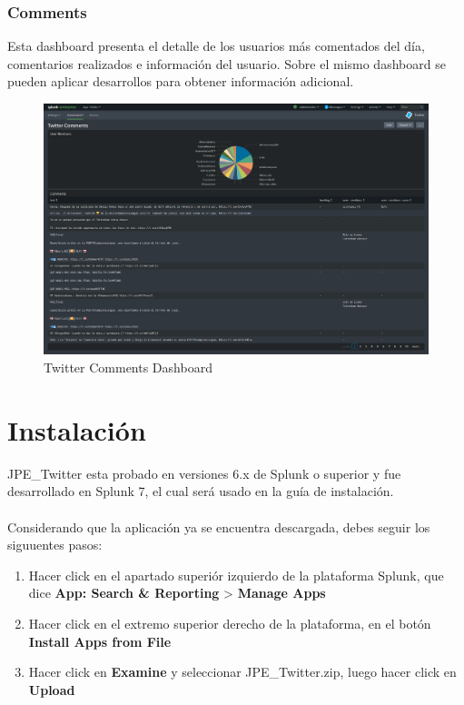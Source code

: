 \documentclass[a4paper]{article}
\begin{document}
\newpage

\subsubsection{Comments}

Esta dashboard presenta el detalle de los usuarios m\'as comentados del d\'ia, comentarios realizados e informaci\'on del usuario. Sobre el mismo dashboard se pueden aplicar desarrollos para obtener informaci\'on adicional.
\newline
\begin{figure}[h!]
	\centering
	\includegraphics[scale=0.2]{img/comments.png}
	\caption{\color{text}Twitter Comments Dashboard}
\end{figure}

\newpage

\section{Instalaci\'on}

JPE\_Twitter esta probado en versiones 6.x de Splunk o superior y fue desarrollado en Splunk 7, el cual ser\'a usado en la gu\'ia de instalaci\'on.\\
\\
Considerando que la aplicaci\'on ya se encuentra descargada, debes seguir los siguuentes pasos:
\newline
\begin{enumerate}[label=(\alph*)]
\item Hacer click en el apartado superi\'or izquierdo de la plataforma Splunk, que dice \textbf{App: Search \& Reporting} > \textbf{Manage Apps}
\item Hacer click en el extremo superior derecho de la plataforma, en el bot\'on \textbf{Install Apps from File}
\item Hacer click en \textbf{Examine} y seleccionar JPE\_Twitter.zip, luego hacer click en \textbf{Upload}
\newline
\end{enumerate}
\end{document}
